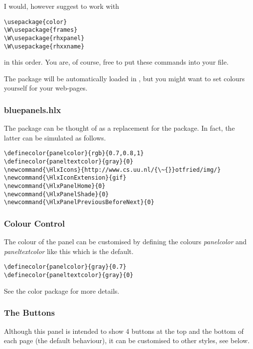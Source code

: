 I would, however suggest to work with
\begin{verbatim}
\usepackage{color}
\W\usepackage{frames}
\W\usepackage{rhxpanel}
\W\usepackage{rhxxname}
\end{verbatim}
in this order. You are, of course, free to put these commands into
your  file.

The  package will be automatically loaded in
, but you might want to set colours yourself for
your web-pages.






\subsubsection{bluepanels.hlx}
The package  can be thought of as a replacement for
the  package. In fact, the latter can be simulated
as follows.
\begin{verbatim}
\definecolor{panelcolor}{rgb}{0.7,0.8,1}
\definecolor{paneltextcolor}{gray}{0}
\newcommand{\HlxIcons}{http://www.cs.uu.nl/{\~{}}otfried/img/}
\newcommand{\HlxIconExtension}{gif}
\newcommand{\HlxPanelHome}{0}
\newcommand{\HlxPanelShade}{0}
\newcommand{\HlxPanelPreviousBeforeNext}{0}
\end{verbatim}








\subsubsection{Colour Control}
The colour of the panel can be customised by defining the colours
\emph{panelcolor} and \emph{paneltextcolor} like this which is the
default.
\begin{verbatim}
\definecolor{panelcolor}{gray}{0.7}
\definecolor{paneltextcolor}{gray}{0}
\end{verbatim}
See the color package for more details.













\subsubsection{The Buttons}
Although this panel is intended to show 4 buttons at the top and
the bottom of each page (the default behaviour), it can be
customised to other styles, see below.

